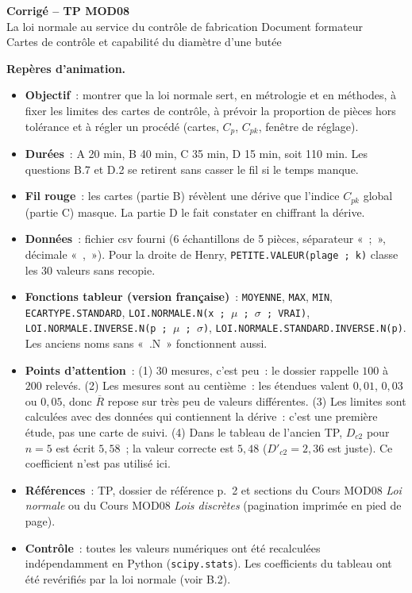 \documentclass[a4paper,11pt]{article}
\newcommand{\Rbar}{\overline{R}}
\newcommand{\LN}{Cours MOD08 \textit{Loi normale}}
\newcommand{\LD}{Cours MOD08 \textit{Lois discrètes}}
\newcommand{\DR}{TP, dossier de référence p.~2}
\begin{document}
\begin{tcolorbox}[colback=uimmblue, colframe=uimmblue, sharp corners, boxrule=0pt,
  left=14pt, right=14pt, top=8pt, bottom=8pt]
{\color{white}\LARGE\bfseries Corrigé -- TP MOD08}\\[4pt]
{\color{white}\large La loi normale au service du contrôle de fabrication \hfill Document formateur}\\[2pt]
{\color{white}\normalsize Cartes de contrôle et capabilité du diamètre d'une butée}
\end{tcolorbox}

\begin{consigne}\small
\textbf{Repères d'animation.}
\begin{itemize}[leftmargin=12pt, itemsep=1pt, topsep=2pt]
  \item \textbf{Objectif}~: montrer que la loi normale sert, en métrologie et en méthodes, à fixer les limites des cartes de contrôle, à prévoir la proportion de pièces hors tolérance et à régler un procédé (cartes, $C_p$, $C_{pk}$, fenêtre de réglage).
  \item \textbf{Durées}~: A 20 min, B 40 min, C 35 min, D 15 min, soit 110 min. Les questions B.7 et D.2 se retirent sans casser le fil si le temps manque.
  \item \textbf{Fil rouge}~: les cartes (partie B) révèlent une dérive que l'indice $C_{pk}$ global (partie C) masque. La partie D le fait constater en chiffrant la dérive.
  \item \textbf{Données}~: fichier csv fourni (6 échantillons de 5 pièces, séparateur «~;~», décimale «~,~»). Pour la droite de Henry, \texttt{PETITE.VALEUR(plage\,;\,k)} classe les $30$ valeurs sans recopie.
  \item \textbf{Fonctions tableur (version française)}~: \texttt{MOYENNE}, \texttt{MAX}, \texttt{MIN}, \texttt{ECARTYPE.STANDARD}, \texttt{LOI.NORMALE.N(x\,;\,$\mu$\,;\,$\sigma$\,;\,VRAI)}, \texttt{LOI.NORMALE.INVERSE.N(p\,;\,$\mu$\,;\,$\sigma$)}, \texttt{LOI.NORMALE.STANDARD.INVERSE.N(p)}. Les anciens noms sans «~.N~» fonctionnent aussi.
  \item \textbf{Points d'attention}~: (1) $30$ mesures, c'est peu~: le dossier rappelle $100$ à $200$ relevés. (2) Les mesures sont au centième~: les étendues valent $0{,}01$, $0{,}03$ ou $0{,}05$, donc $\Rbar$ repose sur très peu de valeurs différentes. (3) Les limites sont calculées avec des données qui contiennent la dérive~: c'est une première étude, pas une carte de suivi. (4) Dans le tableau de l'ancien TP, $D_{c2}$ pour $n = 5$ est écrit $5{,}58$~; la valeur correcte est $5{,}48$ ($D'_{c2} = 2{,}36$ est juste). Ce coefficient n'est pas utilisé ici.
  \item \textbf{Références}~: \DR{} et sections du \LN{} ou du \LD{} (pagination imprimée en pied de page).
  \item \textbf{Contrôle}~: toutes les valeurs numériques ont été recalculées indépendamment en Python (\texttt{scipy.stats}). Les coefficients du tableau ont été revérifiés par la loi normale (voir B.2).
\end{itemize}
\end{consigne}
\end{document}
